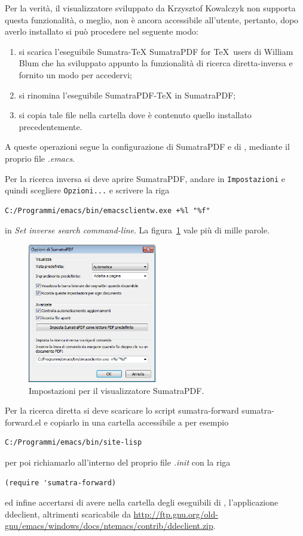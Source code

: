 \documentclass[11pt,a4paper]{article}
\begin{document}
Per la verità, il visualizzatore sviluppato da Krzysztof Kowalczyk non
supporta questa funzionalità, o meglio, non è ancora accessibile
all'utente, pertanto, dopo averlo installato si può procedere nel
seguente modo:
\begin{enumerate}
\item si scarica l'eseguibile Sumatra-\TeX{} %
%
     {SumatraPDF for \TeX\ users}
di William Blum che ha sviluppato appunto la funzionalità di ricerca
diretta-inversa e fornito un modo per accedervi;
\item si rinomina l'eseguibile SumatraPDF-TeX in SumatraPDF;
\item si copia tale file nella cartella dove è contenuto quello
  installato precedentemente.
\end{enumerate}

A queste operazioni segue la configurazione di SumatraPDF e di \emacs,
mediante il proprio file \emph{.emacs}.

Per la ricerca inversa si deve aprire SumatraPDF, andare in
\texttt{Impostazioni} e quindi scegliere \texttt{Opzioni...} e
scrivere la riga
\begin{Verbatim}
C:/Programmi/emacs/bin/emacsclientw.exe +%l "%f"
\end{Verbatim}
in \emph{Set inverse search command-line}. La figura~\ref{oi:fig:sumatra:setup}
vale più di mille parole.

\begin{figure}[t]
  \centering
  \includegraphics[width=0.50\textwidth]{SumatraPDF}
  \caption{Impostazioni per il visualizzatore SumatraPDF.}
  \label{oi:fig:sumatra:setup}
\end{figure}

Per la ricerca diretta si deve scaricare lo script
sumatra-forward %
{sumatra-forward.el} %
e copiarlo in una cartella accessibile a \emacs{} per esempio
\begin{Verbatim}
C:/Programmi/emacs/bin/site-lisp
\end{Verbatim}
 per poi richiamarlo all'interno del proprio file \emph{.init} con la riga
\begin{Verbatim}
(require 'sumatra-forward)
\end{Verbatim}
ed infine accertarsi di avere nella cartella degli eseguibili di
\emacs, l'applicazione \textsf{ddeclient}, altrimenti scaricabile da %
\url{http://ftp.gnu.org/old-gnu/emacs/windows/docs/ntemacs/contrib/ddeclient.zip}.
\end{document}
